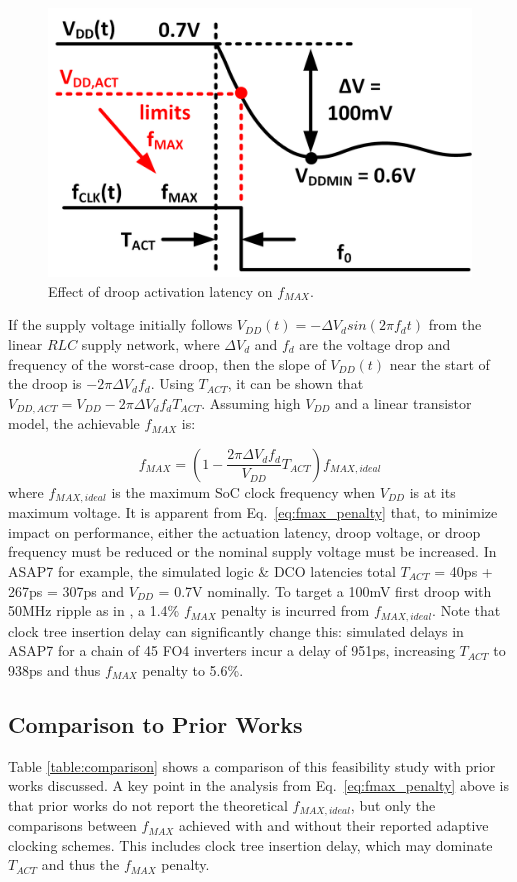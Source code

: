 \documentclass[twoside,9pt,journal,letterpage]{IEEEtran}
\begin{document}
\vspace{-7pt}
\begin{figure}[h]
	\centering
	\includegraphics[width=0.6\columnwidth]{fig_drooplatency}
	\caption{Effect of droop activation latency on $f_{MAX}$.}
	\label{fig:drooplatency}
\end{figure}

If the supply voltage initially follows $V_{DD}(t) = -\Delta V_{d}sin(2\pi f_{d}t)$ from the linear $RLC$ supply network, where $\Delta V_{d}$ and $f_{d}$ are the voltage drop and frequency of the worst-case droop, then the slope of $V_{DD}(t)$ near the start of the droop is $-2\pi \Delta V_{d}f_{d}$. Using $T_{ACT}$, it can be shown that $V_{DD,ACT} = V_{DD}-2\pi \Delta V_{d}f_{d}T_{ACT}$. Assuming high $V_{DD}$ and a linear transistor model, the achievable $f_{MAX}$ is:

\begin{equation}
\label{eq:fmax_penalty}
f_{MAX} = (1 - \frac{2\pi\Delta V_{d}f_{d}}{V_{DD}}T_{ACT})f_{MAX,ideal}
\end{equation} 
where $f_{MAX,ideal}$ is the maximum SoC clock frequency when $V_{DD}$ is at its maximum voltage. It is apparent from Eq.\ \ref{eq:fmax_penalty} that, to minimize impact on performance, either the actuation latency, droop voltage, or droop frequency must be reduced or the nominal supply voltage must be increased. In ASAP7 for example, the simulated logic \& DCO latencies total $T_{ACT}$ = 40ps + 267ps = 307ps and $V_{DD}$ = 0.7V nominally. To target a 100mV first droop with 50MHz ripple as in \cite{hashimoto2018}, a 1.4\% $f_{MAX}$ penalty is incurred from $f_{MAX,ideal}$. Note that clock tree insertion delay can significantly change this: simulated delays in ASAP7 for a chain of 45 FO4 inverters incur a delay of 951ps, increasing $T_{ACT}$ to 938ps and thus $f_{MAX}$ penalty to 5.6\%.

\vspace{-5pt}
\subsection{Comparison to Prior Works}
\label{sec:comp-priors}
Table \ref{table:comparison} shows a comparison of this feasibility study with prior works discussed. A key point in the analysis from Eq.\ \ref{eq:fmax_penalty} above is that prior works do not report the theoretical $f_{MAX,ideal}$, but only the comparisons between $f_{MAX}$ achieved with and without their reported adaptive clocking schemes. This includes clock tree insertion delay, which may dominate $T_{ACT}$ and thus the $f_{MAX}$ penalty.
\end{document}
